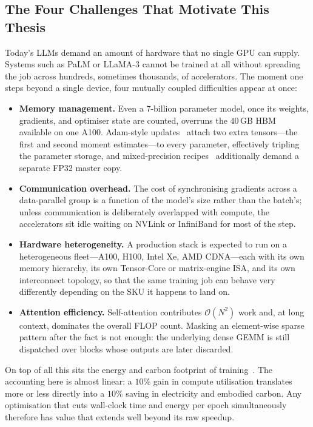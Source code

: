 \subsection{The Four Challenges That Motivate This Thesis}\label{sec:intro_four_challenges}

Today's LLMs demand an amount of hardware that no single GPU can
supply. Systems such as PaLM or LLaMA-3 cannot be trained at all
without spreading the job across hundreds, sometimes thousands, of
accelerators. The moment one steps beyond a single device, four
mutually coupled difficulties appear at once:
\begin{itemize}
    \item \textbf{Memory management.} Even a $7$-billion parameter
          model, once its weights, gradients, and optimiser state are
          counted, overruns the $40$\,GB HBM available on one A100.
          Adam-style updates~\cite{rasley2020deepspeed} attach two
          extra tensors---the first and second moment estimates---to
          every parameter, effectively tripling the parameter storage,
          and mixed-precision recipes~\cite{micikevicius2018amp}
          additionally demand a separate FP32 master copy.
    \item \textbf{Communication overhead.} The cost of synchronising
          gradients across a data-parallel group is a function of the
          model's size rather than the batch's; unless communication
          is deliberately overlapped with compute, the accelerators
          sit idle waiting on NVLink or InfiniBand for most of the
          step.
    \item \textbf{Hardware heterogeneity.} A production stack is
          expected to run on a heterogeneous fleet---A100, H100,
          Intel Xe, AMD CDNA---each with its own memory hierarchy,
          its own Tensor-Core or matrix-engine ISA, and its own
          interconnect topology, so that the same training job can
          behave very differently depending on the SKU it happens
          to land on.
    \item \textbf{Attention efficiency.} Self-attention contributes
          $\mathcal{O}(N^2)$ work and, at long context, dominates the
          overall FLOP count. Masking an element-wise sparse pattern
          after the fact is not enough: the underlying dense GEMM is
          still dispatched over blocks whose outputs are later
          discarded.
\end{itemize}

On top of all this sits the energy and carbon footprint of
training~\cite{patterson2021carbon}. The accounting here is almost
linear: a $10\%$ gain in compute utilisation translates more or less
directly into a $10\%$ saving in electricity and embodied carbon. Any
optimisation that cuts wall-clock time and energy per epoch
simultaneously therefore has value that extends well beyond its raw
speedup.


